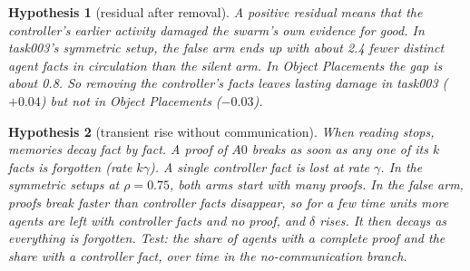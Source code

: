 \documentclass[10pt,a4paper]{article}
\newtheorem{hypothesis}{Hypothesis}
\begin{document}
\begin{hypothesis}[residual after removal]
A positive residual means that the controller's earlier activity damaged the swarm's own evidence for good. In task003's
symmetric setup, the false arm ends up with about 2.4 fewer distinct agent facts in circulation than the silent arm. In
Object Placements the gap is about 0.8. So removing the controller's facts leaves lasting damage in task003 ($+0.04$) but
not in Object Placements ($-0.03$).
\end{hypothesis}

\begin{hypothesis}[transient rise without communication]
When reading stops, memories decay fact by fact. A proof of $A0$ breaks as soon as any one of its $k$ facts is forgotten
(rate $k\gamma$). A single controller fact is lost at rate $\gamma$. In the symmetric setups at $\rho=0.75$, both arms
start with many proofs. In the false arm, proofs break faster than controller facts disappear, so for a few time units
more agents are left with controller facts and no proof, and $\delta$ rises. It then decays as everything is forgotten.
\emph{Test:} the share of agents with a complete proof and the share with a controller fact, over time in the
no-communication branch.
\end{hypothesis}

\end{document}

